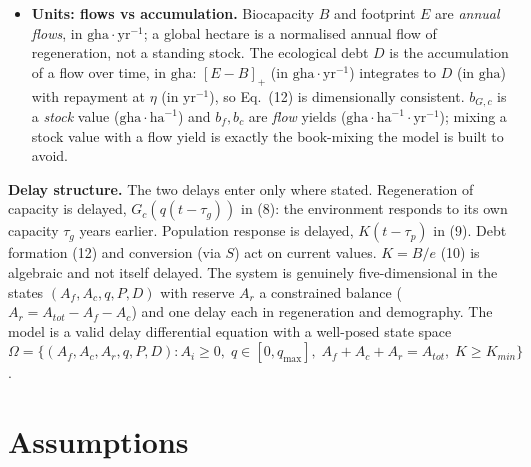 \documentclass[11pt]{article}
\begin{document}
\begin{itemize}
\item \textbf{Units: flows vs accumulation.} Biocapacity $B$ and footprint $E$ are \emph{annual flows}, in $\text{gha}\cdot\text{yr}^{-1}$; a global hectare is a normalised annual flow of regeneration, not a standing stock. The ecological debt $D$ is the accumulation of a flow over time, in $\text{gha}$: $[E-B]_+$ (in $\text{gha}\cdot\text{yr}^{-1}$) integrates to $D$ (in $\text{gha}$) with repayment at $\eta$ (in $\text{yr}^{-1}$), so Eq.~(12) is dimensionally consistent. $b_{G,c}$ is a \emph{stock} value ($\text{gha}\cdot\text{ha}^{-1}$) and $b_f,b_c$ are \emph{flow} yields ($\text{gha}\cdot\text{ha}^{-1}\cdot\text{yr}^{-1}$); mixing a stock value with a flow yield is exactly the book-mixing the model is built to avoid.
\end{itemize}

\textbf{Delay structure.} The two delays enter only where stated. Regeneration of capacity is delayed, $G_c(q(t-\tau_g))$ in (8): the environment responds to its own capacity $\tau_g$ years earlier. Population response is delayed, $K(t-\tau_p)$ in (9). Debt formation (12) and conversion (via $S$) act on current values. $K=B/e$ (10) is algebraic and not itself delayed. The system is genuinely five-dimensional in the states $(A_f,A_c,q,P,D)$ with reserve $A_r$ a constrained balance ($A_r=A_{tot}-A_f-A_c$) and one delay each in regeneration and demography. The model is a valid delay differential equation with a well-posed state space $\Omega=\{(A_f,A_c,A_r,q,P,D):A_i\ge0,\;q\in[0,q_{\max}],\;A_f+A_c+A_r=A_{tot},\;K\ge K_{min}\}$.

\section{Assumptions}
\end{document}
